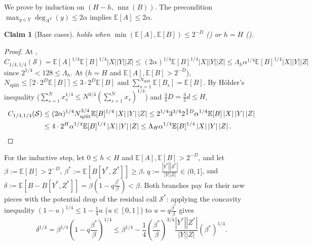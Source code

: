 \documentclass[11pt]{article}
\newtheorem{claim}[theorem]{Claim}
\theoremstyle{definition}
\renewcommand{\label}[1]{}%
\newcommand{\E}{\mathbb{E}}
\newcommand{\nnz}{\operatorname{nnz}}
\newcommand{\abs}[1]{\left\lvert #1 \right\rvert}
\newcommand{\dens}[1]{\E[#1]}
\newcommand{\pot}{C_{1/4,1/4}}
\begin{document}
We prove  by induction on $(H - h, \, \nnz(B))$. The precondition $\max_{y \in Y}\deg_{A^T}(y) \le 2\alpha$ implies $\dens{A} \le 2\alpha$.

\begin{claim}[Base cases]
\label{clm:pot-base}
 holds when $\min(\dens{A}, \dens{B}) \le 2^{-D}$ () or $h = H$ ().
\end{claim}

\begin{proof}
At , $\pot(\mathcal{S}) = \dens{A}^{1/4}\dens{B}^{1/4}\abs{X}\abs{Y}\abs{Z} \le (2\alpha)^{1/4}\dens{B}^{1/4}\abs{X}\abs{Y}\abs{Z} \le \Lambda_h \alpha^{1/4}\dens{B}^{1/4}\abs{X}\abs{Y}\abs{Z}$ since $2^{1/4} < 128 \le \Lambda_h$. At  ($h = H$ and $\dens{A}, \dens{B} > 2^{-D}$), $N_{\text{split}} \le \lceil 2 \cdot 2^D \dens{B} \rceil \le 3 \cdot 2^D \dens{B}$ and $\sum_{s=1}^{N_{\text{split}}} \dens{B_s} = \dens{B}$. By H\"older's inequality ($\sum_{s=1}^N x_s^{1/4} \le N^{3/4}(\sum_{s=1}^N x_s)^{1/4}$) and $\frac{3}{4}D = \frac{3}{2}d \le H$,
\begin{align*}
    \pot(\mathcal{S}) &\le (2\alpha)^{1/4} N_{\text{split}}^{3/4}\dens{B}^{1/4}\abs{X}\abs{Y}\abs{Z} \le 2^{1/4} 3^{3/4} 2^{\frac{3}{4}D}\alpha^{1/4}\dens{B}\abs{X}\abs{Y}\abs{Z} \\
    &\le 4 \cdot 2^H \alpha^{1/4}\dens{B}^{1/4}\abs{X}\abs{Y}\abs{Z} \le \Lambda_H \alpha^{1/4}\dens{B}^{1/4}\abs{X}\abs{Y}\abs{Z}. \qedhere
\end{align*}
\end{proof}

For the inductive step, let $0 \le h < H$ and $\dens{A}, \dens{B} > 2^{-D}$, and let $\beta := \dens{B} > 2^{-D}$, $\beta^* := \dens{B[Y^*, Z^*]} \ge \beta$, $q := \frac{\abs{Y^*}\abs{Z^*}}{\abs{Y}\abs{Z}} \in (0, 1]$, and $\delta := \dens{B - B[Y^*, Z^*]} = \beta(1 - q\frac{\beta^*}{\beta}) < \beta$. Both branches pay for their new pieces with the potential drop of the residual call $\mathcal{S}^*$: applying the concavity inequality $(1 - u)^{1/4} \le 1 - \frac{1}{4}u$ ($u \in [0, 1]$) to $u = q\frac{\beta^*}{\beta}$ gives
\begin{equation}\label{eq:concavity-drop}
    \delta^{1/4} = \beta^{1/4}\left(1 - q\frac{\beta^*}{\beta}\right)^{1/4} \le \beta^{1/4} - \frac{1}{4}\left(\frac{\beta^*}{\beta}\right)^{3/4}\frac{\abs{Y^*}\abs{Z^*}}{\abs{Y}\abs{Z}}(\beta^*)^{1/4}.
\end{equation}
\end{document}
